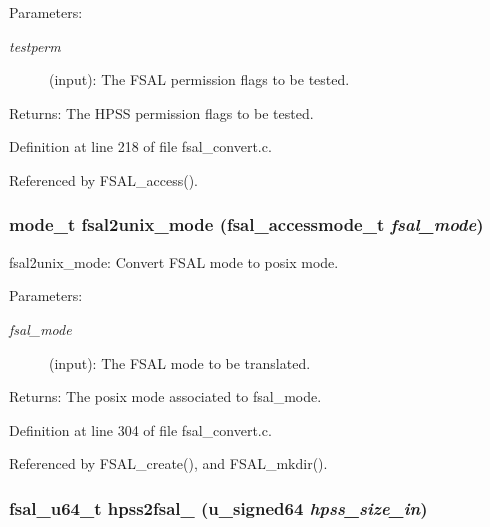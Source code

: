 \begin{Desc}
\item[Parameters:]
\begin{description}
\item[{\em testperm}](input): The FSAL permission flags to be tested.\end{description}
\end{Desc}
\begin{Desc}
\item[Returns:]The HPSS permission flags to be tested. \end{Desc}


Definition at line 218 of file fsal\_\-convert.c.

Referenced by FSAL\_\-access().
\subsubsection{\setlength{\rightskip}{0pt plus 5cm}mode\_\-t fsal2unix\_\-mode (fsal\_\-accessmode\_\-t {\em fsal\_\-mode})}\label{fsal__convert_8c_a5}


fsal2unix\_\-mode: Convert FSAL mode to posix mode.

\begin{Desc}
\item[Parameters:]
\begin{description}
\item[{\em fsal\_\-mode}](input): The FSAL mode to be translated.\end{description}
\end{Desc}
\begin{Desc}
\item[Returns:]The posix mode associated to fsal\_\-mode. \end{Desc}


Definition at line 304 of file fsal\_\-convert.c.

Referenced by FSAL\_\-create(), and FSAL\_\-mkdir().
\subsubsection{\setlength{\rightskip}{0pt plus 5cm}fsal\_\-u64\_\-t hpss2fsal\_ (u\_\-signed64 {\em hpss\_\-size\_\-in})}\label{fsal__convert_8c_a9}


